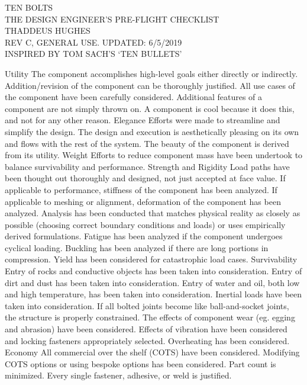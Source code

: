 \documentclass[letterpaper]{article}
\begin{document}
\selectfont
{\large
TEN BOLTS \\
THE DESIGN ENGINEER'S PRE-FLIGHT CHECKLIST \\
THADDEUS HUGHES \\
REV C, GENERAL USE. UPDATED: 6/5/2019 \\
INSPIRED BY TOM SACH'S `TEN BULLETS' }

\begin{outline}
\1 Utility
	\2 The component accomplishes high-level goals either directly or indirectly. Addition/revision of the component can be thoroughly justified.
	\2 All use cases of the component have been carefully considered. Additional features of a component are not simply thrown on.
	\2 A component is cool because it does this, and not for any other reason.
\1 Elegance
	\2 Efforts were made to streamline and simplify the design.
	\2 The design and execution is aesthetically pleasing on its own and flows with the rest of the system.
	\2 The beauty of the component is derived from its utility.
\1 Weight
	\2 Efforts to reduce component mass have been undertook to balance survivability and performance.
\1 Strength and Rigidity
	\2 Load paths have been thought out thoroughly and designed, not just accepted at face value.
	\2 If applicable to performance, stiffness of the component has been analyzed.
	\2 If applicable to meshing or alignment, deformation of the component has been analyzed.
	\2 Analysis has been conducted that matches physical reality as closely as possible (choosing correct boundary conditions and loads) or uses empirically derived formulations.
	\2 Fatigue has been analyzed if the component undergoes cyclical loading.
	\2 Buckling has been analyzed if there are long portions in compression.
	\2 Yield has been considered for catastrophic load cases.
\1 Survivability
	\2 Entry of rocks and conductive objects has been taken into consideration.
	\2 Entry of dirt and dust has been taken into consideration.
	\2 Entry of water and oil, both low and high temperature, has been taken into consideration.
	\2 Inertial loads have been taken into consideration.
	\2 If all bolted joints become like ball-and-socket joints, the structure is properly constrained.
	\2 The effects of component wear (eg. egging and abrasion) have been considered.
	\2 Effects of vibration have been considered and locking fasteners appropriately selected.
	\2 Overheating has been considered.
\1 Economy
	\2 All commercial over the shelf (COTS) have been considered.
	\2 Modifying COTS options or using bespoke options has been considered.
	\2 Part count is minimized. Every single fastener, adhesive, or weld is justified.

\end{outline}
\end{document}
